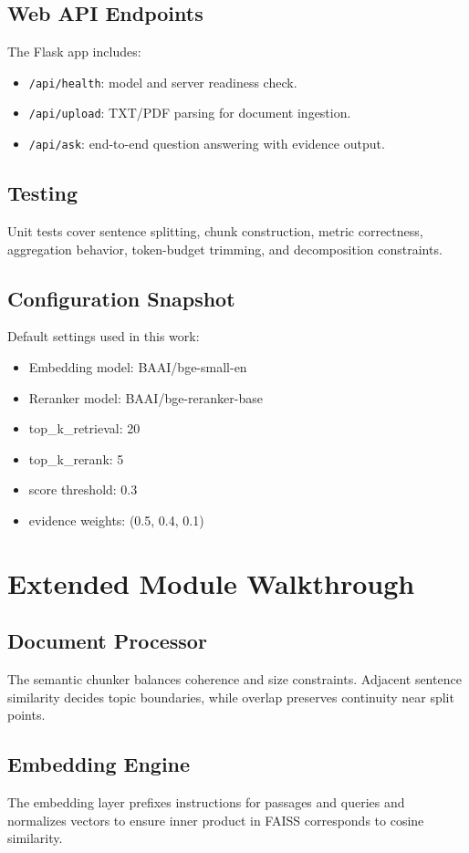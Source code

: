 \documentclass[10pt,draftclsnofoot,onecolumn,journal]{IEEEtran}
\begin{document}
\subsection{Web API Endpoints}
The Flask app includes:
\begin{itemize}
\item \texttt{/api/health}: model and server readiness check.
\item \texttt{/api/upload}: TXT/PDF parsing for document ingestion.
\item \texttt{/api/ask}: end-to-end question answering with evidence output.
\end{itemize}

\subsection{Testing}
Unit tests cover sentence splitting, chunk construction, metric correctness, aggregation behavior, token-budget trimming, and decomposition constraints.

\subsection{Configuration Snapshot}
Default settings used in this work:
\begin{itemize}
\item Embedding model: BAAI/bge-small-en
\item Reranker model: BAAI/bge-reranker-base
\item top\_k\_retrieval: 20
\item top\_k\_rerank: 5
\item score threshold: 0.3
\item evidence weights: (0.5, 0.4, 0.1)
\end{itemize}

\section{Extended Module Walkthrough}
\subsection{Document Processor}
The semantic chunker balances coherence and size constraints. Adjacent sentence similarity decides topic boundaries, while overlap preserves continuity near split points.

\subsection{Embedding Engine}
The embedding layer prefixes instructions for passages and queries and normalizes vectors to ensure inner product in FAISS corresponds to cosine similarity.
\end{document}
